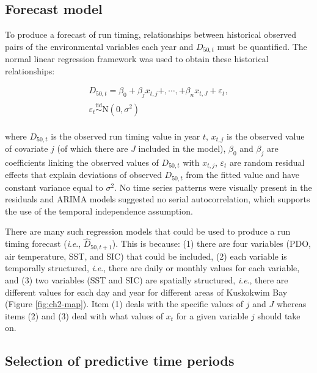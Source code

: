 \documentclass[12pt,]{book}
\theoremstyle{definition}
\theoremstyle{definition}
\theoremstyle{definition}
\theoremstyle{remark}
\begin{document}
\subsection{Forecast model}\label{reg-models}

\noindent
To produce a forecast of run timing, relationships between historical
observed pairs of the environmental variables each year and \(D_{50,t}\)
must be quantified. The normal linear regression framework was used to
obtain these historical relationships:

\begin{equation}
  \begin{split}
    D_{50,t} = \beta_0 + \beta_j x_{t,j} +, \cdots ,+ \beta_n x_{t,J} + \varepsilon_t, \\
    \varepsilon_t \stackrel{\text{iid}}{\sim} \text{N}(0, \sigma^2) \\
  \end{split}
\label{eq:lin-reg}
\end{equation}

\noindent
where \(D_{50,t}\) is the observed run timing value in year \(t\),
\(x_{t,j}\) is the observed value of covariate \(j\) (of which there are
\(J\) included in the model), \(\beta_0\) and \(\beta_j\) are
coefficients linking the observed values of \(D_{50,t}\) with
\(x_{t,j}\), \(\varepsilon_t\) are random residual effects that explain
deviations of observed \(D_{50,t}\) from the fitted value and have
constant variance equal to \(\sigma^2\). No time series patterns were
visually present in the residuals and ARIMA models suggested no serial
autocorrelation, which supports the use of the temporal independence
assumption.

There are many such regression models that could be used to produce a
run timing forecast (\emph{i}.\emph{e}., \(\hat{D}_{50,t+1}\)). This is
because: (1) there are four variables (PDO, air temperature, SST, and
SIC) that could be included, (2) each variable is temporally structured,
\emph{i}.\emph{e}., there are daily or monthly values for each variable,
and (3) two variables (SST and SIC) are spatially structured,
\emph{i}.\emph{e}., there are different values for each day and year for
different areas of Kuskokwim Bay (Figure \ref{fig:ch2-map}). Item (1)
deals with the specific values of \(j\) and \(J\) whereas items (2) and
(3) deal with what values of \(x_{t}\) for a given variable \(j\) should
take on.

\subsection{Selection of predictive time periods}\label{clim-windows}
\end{document}
